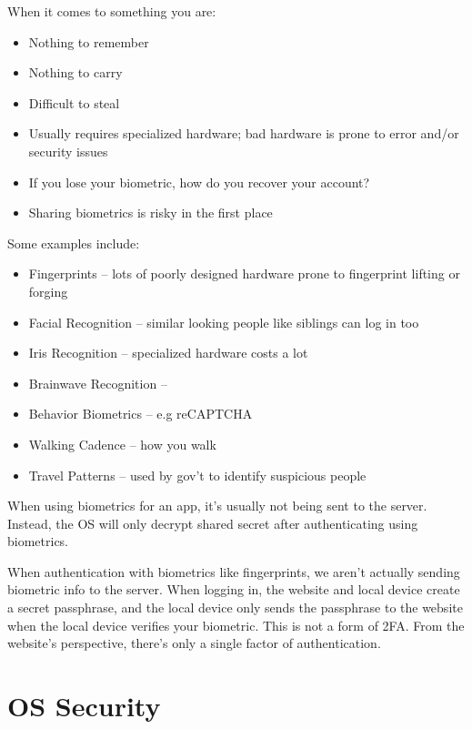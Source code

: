 \documentclass[12pt]{report}
\begin{document}
When it comes to something you are:
\begin{itemize}[noitemsep]
    \item Nothing to remember
    \item Nothing to carry
    \item Difficult to steal
    \item Usually requires specialized hardware; bad hardware is prone to error and/or security issues
    \item If you lose your biometric, how do you recover your account?
    \item Sharing biometrics is risky in the first place
\end{itemize}

Some examples include:
\begin{itemize}[noitemsep]
    \item Fingerprints -- lots of poorly designed hardware prone to fingerprint lifting or forging
    \item Facial Recognition -- similar looking people like siblings can log in too
    \item Iris Recognition -- specialized hardware costs a lot
    \item Brainwave Recognition --
    \item Behavior Biometrics -- e.g reCAPTCHA
    \item Walking Cadence -- how you walk
    \item Travel Patterns -- used by gov't to identify suspicious people
\end{itemize}

When using biometrics for an app, it's usually not being sent to the server. Instead, the OS will only decrypt shared secret after authenticating using biometrics.

\begin{notebox}{}
    When authentication with biometrics like fingerprints, we aren't actually sending biometric info to the server. When logging in, the website and local device create a secret passphrase, and the local device only sends the passphrase to the website when the local device verifies your biometric. This is not a form of 2FA. From the website's perspective, there's only a single factor of authentication.
\end{notebox}

\chapter{OS Security}
\end{document}
